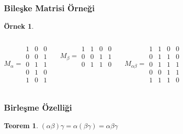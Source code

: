 \documentclass[dvipsnames]{beamer}
\theoremstyle{definition}
\theoremstyle{example}
\newtheorem{ornek}[theorem]{Örnek}
\theoremstyle{plain}
\newtheorem{teorem}[theorem]{Teorem}
\begin{document}
\begin{frame}
  \frametitle{Bileşke Matrisi Örneği}

  \begin{ornek}
    \begin{columns}
      \[ M_\alpha =
         \begin{array}{|ccc|}
           1 & 0 & 0\\
           0 & 0 & 1\\
           0 & 1 & 1\\
           0 & 1 & 0\\
           1 & 0 & 1
         \end{array}
      \]

      \[ M_\beta =
         \begin{array}{|cccc|}
           1 & 1 & 0 & 0\\
           0 & 0 & 1 & 1\\
           0 & 1 & 1 & 0
         \end{array}
      \]

      \[ M_{\alpha \beta} =
         \begin{array}{|cccc|}
           1 & 1 & 0 & 0\\
           0 & 1 & 1 & 0\\
           0 & 1 & 1 & 1\\
           0 & 0 & 1 & 1\\
           1 & 1 & 1 & 0
        \end{array}
      \]
    \end{columns}
  \end{ornek}
\end{frame}

\begin{frame}
  \frametitle{Birleşme Özelliği}

  \begin{teorem}
      $(\alpha \beta) \gamma = \alpha (\beta \gamma) = \alpha \beta \gamma$
  \end{teorem}
\end{frame}
\end{document}
